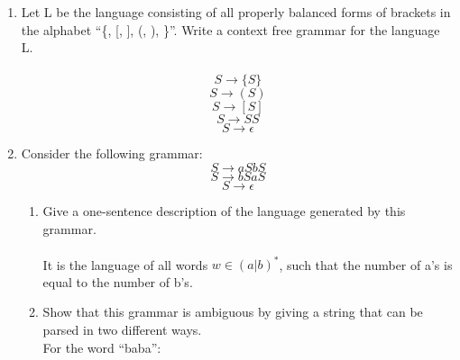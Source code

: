 
\usepackage{amsmath, verbatim, tikz, float, dsfont}


\usetikzlibrary{graphdrawing, graphdrawing.trees, arrows,automata}

\oddsidemargin 0in
\evensidemargin 0in
\textwidth 6.5in
\topmargin -0.5in
\textheight 9.0in
\newcommand{\norm}[1]{\left\lVert #1 \right\rVert}
\newcommand{\?}{\stackrel{?}{=}}



\pagestyle{myheadings}


\begin{enumerate}
    \item Let L be the language consisting of all properly balanced forms of brackets in the alphabet ``\{, [, ], (, ), \}''. Write a context free grammar for the language L.\\\\

    $$S \rightarrow \{S\}$$
    $$S \rightarrow (S)$$
    $$S \rightarrow [S]$$
    $$S \rightarrow S S$$
    $$S \rightarrow \epsilon$$

    \item Consider the following grammar:
          $$S \rightarrow aSbS$$
          $$S \rightarrow bSaS$$
          $$S \rightarrow \epsilon$$

    \begin{enumerate}
      \item Give a one-sentence description of the language generated by this grammar.\\\\

      It is the language of all words $w \in (a | b)^*$, such that the number of a's is equal to the number of b's.\\

      \item Show that this grammar is ambiguous by giving a string that can be parsed in two different ways.\\

      For the word ``baba'':

\end{enumerate}
\end{enumerate}
